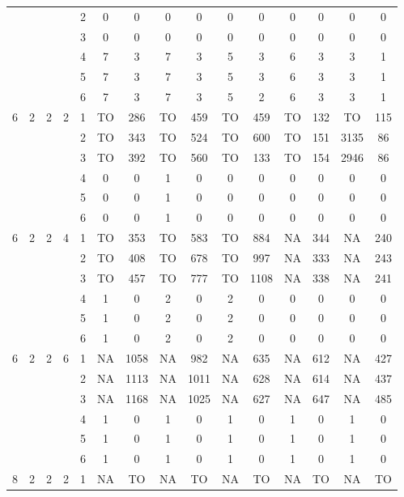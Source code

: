 \begin{longtable}{|c|c|c|c|c|c c|c c|c c|c c|c c|}
 & & & & 2 & 0 & 0 & 0 & 0 & 0 & 0 & 0 & 0 & 0 & 0 \\
 & & & & 3 & 0 & 0 & 0 & 0 & 0 & 0 & 0 & 0 & 0 & 0 \\
 & & & & 4 & 7 & 3 & 7 & 3 & 5 & 3 & 6 & 3 & 3 & 1 \\
 & & & & 5 & 7 & 3 & 7 & 3 & 5 & 3 & 6 & 3 & 3 & 1 \\
 & & & & 6 & 7 & 3 & 7 & 3 & 5 & 2 & 6 & 3 & 3 & 1 \\
\hline
\multirow{6}{*}{6} & \multirow{6}{*}{2} & \multirow{6}{*}{2} & \multirow{6}{*}{2} & 1 & TO & 286 & TO & 459 & TO & 459 & TO & 132 & TO & 115 \\
 & & & & 2 & TO & 343 & TO & 524 & TO & 600 & TO & 151 & 3135 & 86 \\
 & & & & 3 & TO & 392 & TO & 560 & TO & 133 & TO & 154 & 2946 & 86 \\
 & & & & 4 & 0 & 0 & 1 & 0 & 0 & 0 & 0 & 0 & 0 & 0 \\
 & & & & 5 & 0 & 0 & 1 & 0 & 0 & 0 & 0 & 0 & 0 & 0 \\
 & & & & 6 & 0 & 0 & 1 & 0 & 0 & 0 & 0 & 0 & 0 & 0 \\
\hline
\multirow{6}{*}{6} & \multirow{6}{*}{2} & \multirow{6}{*}{2} & \multirow{6}{*}{4} & 1 & TO & 353 & TO & 583 & TO & 884 & NA & 344 & NA & 240 \\
 & & & & 2 & TO & 408 & TO & 678 & TO & 997 & NA & 333 & NA & 243 \\
 & & & & 3 & TO & 457 & TO & 777 & TO & 1108 & NA & 338 & NA & 241 \\
 & & & & 4 & 1 & 0 & 2 & 0 & 2 & 0 & 0 & 0 & 0 & 0 \\
 & & & & 5 & 1 & 0 & 2 & 0 & 2 & 0 & 0 & 0 & 0 & 0 \\
 & & & & 6 & 1 & 0 & 2 & 0 & 2 & 0 & 0 & 0 & 0 & 0 \\
\hline
\multirow{6}{*}{6} & \multirow{6}{*}{2} & \multirow{6}{*}{2} & \multirow{6}{*}{6} & 1 & NA & 1058 & NA & 982 & NA & 635 & NA & 612 & NA & 427 \\
 & & & & 2 & NA & 1113 & NA & 1011 & NA & 628 & NA & 614 & NA & 437 \\
 & & & & 3 & NA & 1168 & NA & 1025 & NA & 627 & NA & 647 & NA & 485 \\
 & & & & 4 & 1 & 0 & 1 & 0 & 1 & 0 & 1 & 0 & 1 & 0 \\
 & & & & 5 & 1 & 0 & 1 & 0 & 1 & 0 & 1 & 0 & 1 & 0 \\
 & & & & 6 & 1 & 0 & 1 & 0 & 1 & 0 & 1 & 0 & 1 & 0 \\
\hline
\multirow{6}{*}{8} & \multirow{6}{*}{2} & \multirow{6}{*}{2} & \multirow{6}{*}{2} & 1 & NA & TO & NA & TO & NA & TO & NA & TO & NA & TO \\

\end{longtable}

